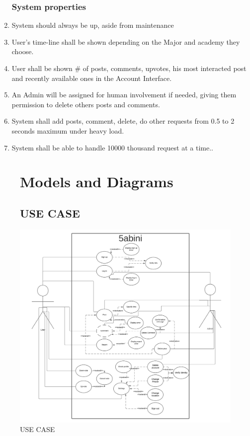 \documentclass[12pt]{article}
\begin{document}
\begin{enumerate}
\subsubsection*{System properties}
\item System should always be up, aside from maintenance

\item User's time-line shall be shown depending on the Major and academy they choose.
\item User shall be shown \# of posts, comments, upvotes, his most interacted post and recently available ones in the Account Interface.
\item An Admin will be assigned for human involvement if needed, giving them permission to delete others posts and comments.
\item System shall add posts, comment, delete, do other requests from 0.5 to 2 seconds maximum under heavy load.
\item System shall be able to handle 10000 thousand request at a time..
\end{enumerate}
\sectionbreak

\begin{figure}[b]
\section{Models and Diagrams}
\subsection{USE CASE}
\centerline{\includegraphics[width=1.4\textwidth]{./USECASE/5abiniUseCase.png}}
\caption{USE CASE}
\end{figure}
\twocolumn
\end{document}
